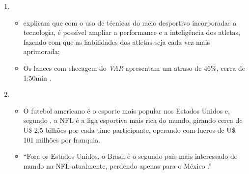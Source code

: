 \begin{enumerate}
\item
    \begin{itemize}
    \item {} explicam que com o uso de técnicas do meio desportivo incorporadas
    a tecnologia, é possível ampliar a performance e a inteligência dos atletas, fazendo com
    que as habilidades dos atletas seja cada vez mais aprimorada;
    \item Os lances com checagem do \textit{VAR} apresentam
    um atraso de 46\%, cerca de 1:50min \cite{ESTADAO2019}.
    \end{itemize}
\item
    \begin{itemize}
    \item O futebol americano é o esporte mais popular nos Estados Unidos e, segundo , a NFL é a liga esportiva mais rica do mundo, girando cerca de U\$ 2,5 bilhões por cada time participante, operando com lucros de U\$ 101 milhões por franquia.
    
    \item “Fora os Estados Unidos, o Brasil é o segundo país mais interessado do mundo na NFL atualmente, perdendo apenas para o México \cite{FOLHASP2019}.”
    \end{itemize}
\end{enumerate}